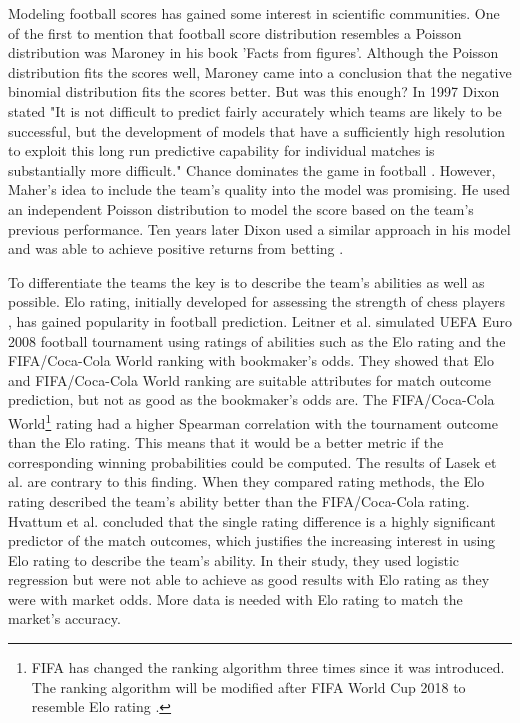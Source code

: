 Modeling football scores has gained some interest in scientific communities. One of the first to mention that football score distribution resembles a Poisson distribution was Maroney \cite{moroney1962facts} in his book 'Facts from figures'. Although the Poisson distribution fits the scores well, Maroney came into a conclusion that the negative binomial distribution fits the scores better. But was this enough? In 1997 Dixon stated \cite{dixon1997} "It is not difficult to predict fairly accurately which teams are likely to be successful, but the development of models that have a sufficiently high resolution to exploit this long run predictive capability for individual matches is substantially more difficult." Chance dominates the game in football \cite{ben2006parity}. However, Maher's \cite{maher1982modelling} idea to include the team's quality into the model was promising. He used an independent Poisson distribution to model the score based on the team's previous performance. Ten years later Dixon used a similar approach in his model and was able to achieve positive returns from betting \cite{dixon1997}.

To differentiate the teams the key is to describe the team's abilities as well as possible. Elo rating, initially developed for assessing the strength of chess players \cite{elo1978rating}, has gained popularity in football prediction. Leitner et al. \cite{leitner2010forecasting} simulated UEFA Euro 2008 football tournament using ratings of abilities such as the Elo rating and the FIFA/Coca-Cola World ranking with bookmaker's odds. They showed that Elo and FIFA/Coca-Cola World ranking are suitable attributes for match outcome prediction, but not as good as the bookmaker's odds are. The FIFA/Coca-Cola World\footnote{FIFA has changed the ranking algorithm three times since it was introduced. The ranking algorithm will be modified after FIFA World Cup 2018 to resemble Elo rating \cite{wiki:fifarating}.} rating had a higher Spearman correlation with the tournament outcome than the Elo rating. This means that it would be a better metric if the corresponding winning probabilities could be computed. \cite{leitner2010forecasting} The results of Lasek et al. \cite{lasek2013predictive} are contrary to this finding. When they compared rating methods, the Elo rating described the team's ability better than the FIFA/Coca-Cola rating. Hvattum et al. \cite{hvattum2010using} concluded that the single rating difference is a highly significant predictor of the match outcomes, which justifies the increasing interest in using Elo rating to describe the team's ability. In their study, they used logistic regression but were not able to achieve as good results with Elo rating as they were with market odds. More data is needed with Elo rating to match the market's accuracy.


